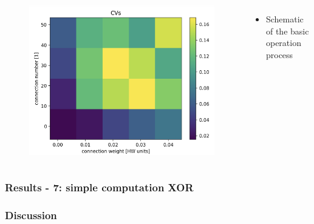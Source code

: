 \documentclass{beamer}
\begin{document}
\begin{frame}
\begin{columns}
          \begin{figure}
    				\centering
    				\includegraphics[width=\linewidth]{figures/CV_sweep.png}
 		   \end{figure}
 		   \begin{itemize}
          		\item Schematic of the basic operation process
          	\end{itemize}

	\end{columns}

\end{frame}

\begin{frame}
    \frametitle{Results - 7: simple computation XOR}
\end{frame}

\begin{frame}
    \frametitle{Discussion}
\end{frame}
\end{document}
